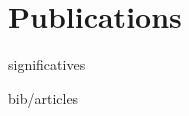\documentclass{cv-style}     %
\begin{document}

\section{Publications}{ significatives}

\nocite{vallverdu2016, guille2015, Guille2014, Martin2012, Maillet2011, Vallverdu2010}
\begin{btSect}{bib/articles}
    \btPrintCited
\end{btSect}


%

\end{document}
